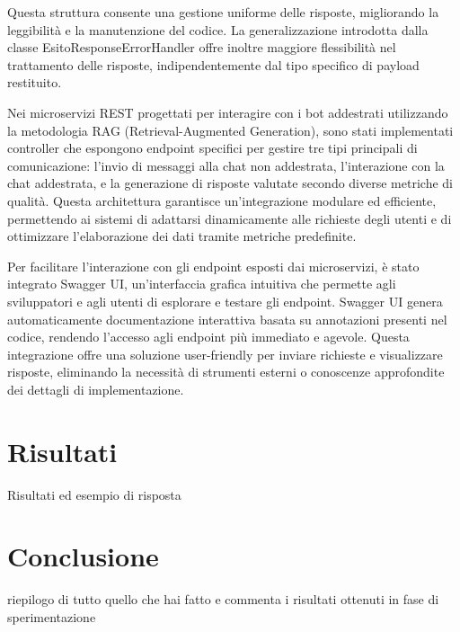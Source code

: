 \documentclass[a4paper,twoside,12pt]{toptesi}
\begin{document}
Questa struttura consente una gestione uniforme delle risposte, migliorando la leggibilità e la manutenzione del codice. La generalizzazione introdotta dalla classe EsitoResponseErrorHandler offre inoltre maggiore flessibilità nel trattamento delle risposte, indipendentemente dal tipo specifico di payload restituito.

Nei microservizi REST progettati per interagire con i bot addestrati utilizzando la metodologia RAG (Retrieval-Augmented Generation), sono stati implementati controller che espongono endpoint specifici per gestire tre tipi principali di comunicazione: l'invio di messaggi alla chat non addestrata, l'interazione con la chat addestrata, e la generazione di risposte valutate secondo diverse metriche di qualità. Questa architettura garantisce un'integrazione modulare ed efficiente, permettendo ai sistemi di adattarsi dinamicamente alle richieste degli utenti e di ottimizzare l'elaborazione dei dati tramite metriche predefinite.

Per facilitare l'interazione con gli endpoint esposti dai microservizi, è stato integrato Swagger UI, un'interfaccia grafica intuitiva che permette agli sviluppatori e agli utenti di esplorare e testare gli endpoint. Swagger UI genera automaticamente documentazione interattiva basata su annotazioni presenti nel codice, rendendo l'accesso agli endpoint più immediato e agevole. Questa integrazione offre una soluzione user-friendly per inviare richieste e visualizzare risposte, eliminando la necessità di strumenti esterni o conoscenze approfondite dei dettagli di implementazione.

\chapter{Risultati}

Risultati ed esempio di risposta

\chapter{Conclusione}
 riepilogo di tutto quello che hai fatto e commenta i risultati ottenuti in fase di sperimentazione

  


\end{document}

